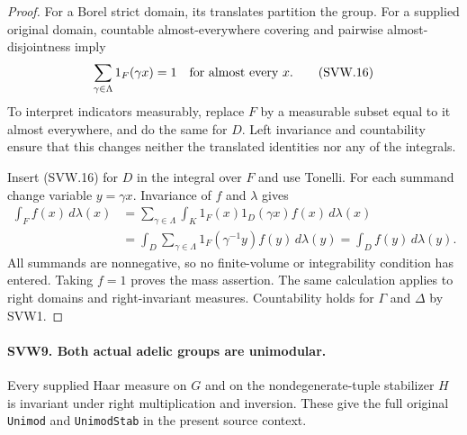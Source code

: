 \begin{proof}
For a Borel strict domain, its translates partition the group.
For a supplied original domain, countable almost-everywhere
covering and pairwise almost-disjointness imply
\[
                  \sum_{\gamma\in\Lambda}1_F(\gamma x)=1
                         \quad\hbox{for almost every }x.
 \tag{SVW.16}
\]
To interpret indicators measurably, replace $F$ by a measurable
subset equal to it almost everywhere, and do the same for $D$.
Left invariance and countability ensure that this changes neither
the translated identities nor any of the integrals.

Insert (SVW.16) for $D$ in the integral over $F$ and use Tonelli.
For each summand change variable $y=\gamma x$.  Invariance of $f$
and $\lambda$ gives
\[
 \begin{split}
 \int_F f(x)\,d\lambda(x)
 &=\sum_{\gamma\in\Lambda}
      \int_K1_F(x)1_D(\gamma x)f(x)\,d\lambda(x)\\
 &=\int_D\sum_{\gamma\in\Lambda}1_F(\gamma^{-1}y)
                                     f(y)\,d\lambda(y)
 =\int_D f(y)\,d\lambda(y).
 \end{split}
 \tag{SVW.17}
\]
All summands are nonnegative, so no finite-volume or integrability
condition has entered.  Taking $f=1$ proves the mass assertion.
The same calculation applies to right domains and right-invariant
measures.  Countability holds for $\Gamma$ and $\Delta$ by SVW1.
\end{proof}

\paragraph{SVW9. Both actual adelic groups are unimodular.}
\label{claim:SVW9}
Every supplied Haar measure on $G$ and on the nondegenerate-tuple
stabilizer $H$ is invariant under right multiplication and inversion.
These give the full original \texttt{Unimod} and
\texttt{UnimodStab} in the present source context.

